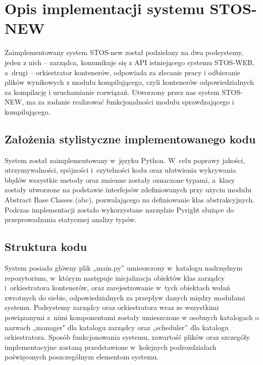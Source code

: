\section{Opis implementacji systemu STOS-NEW}
Zaimplementowany system STOS-new został podzielony na dwa podsystemy, jeden z nich -- zarządca, komunikuje się z API istniejącego systemu STOS-WEB, a~drugi -- orkiestrator kontenerów, odpowiada za zlecanie pracy i odbieranie plików wynikowych z modułu kompilującego, czyli kontenerów odpowiedzialnych za kompilację i uruchamianie rozwiązań. Utworzony przez nas system STOS-NEW, ma za zadanie realizować funkcjonalności modułu sprawdzającego i kompilującego.

\subsection{Założenia stylistyczne implementowanego kodu}
System został zaimplementowany w~języku Python. W~celu poprawy jakości, utrzymywalności, spójności i~czytelności kodu oraz ułatwienia wykrywania błędów wszystkie metody oraz zmienne zostały oznaczone typami, a~klasy zostały utworzone na podstawie interfejsów zdefiniowanych przy użyciu modułu Abstract Base Classes (abc)\cite{pythonAbc}, pozwalającego na definiowanie klas abstrakcyjnych. Podczas implementacji zostało wykorzystane narzędzie Pyright służące do przeprowadzania statycznej analizy typów.

\subsection{Struktura kodu}
System posiada główny plik „main.py” umieszczony w~katalogu nadrzędnym repozytorium, w~którym następuje inicjalizacja obiektów klas zarządcy i~orkiestratora kontenerów, oraz zarejestrowanie w~tych obiektach wołań zwrotnych do siebie, odpowiedzialnych za przepływ danych między modułami systemu. Podsystemy zarządcy oraz orkiestratora wraz ze wszystkimi powiązanymi z~nimi komponentami zostały umieszczone w osobnych katalogach o nazwach „manager" dla katalogu zarządcy oraz „scheduler” dla katalogu orkiestratora.
Sposób funkcjonowania systemu, zawartość plików oraz szczegóły implementacyjne zostaną przedstawione w~kolejnych podrozdziałach poświęconych poszczególnym elementom systemu. 
